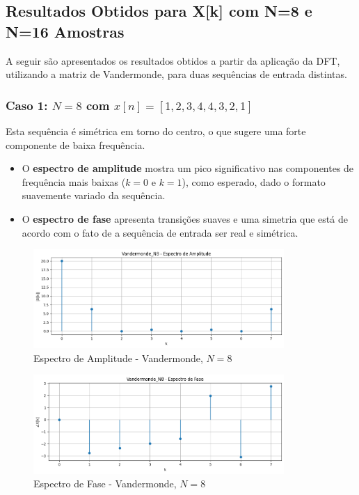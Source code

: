 \documentclass[12pt]{article}
\begin{document}
\newpage
\subsection{Resultados Obtidos para X[k] com N=8 e N=16 Amostras}

A seguir são apresentados os resultados obtidos a partir da aplicação da DFT, utilizando a matriz de Vandermonde, para duas sequências de entrada distintas.

\subsubsection{Caso 1: $N = 8$ com $x[n] = [1, 2, 3, 4, 4, 3, 2, 1]$}

Esta sequência é simétrica em torno do centro, o que sugere uma forte componente de baixa frequência.

\begin{itemize}
    \item O \textbf{espectro de amplitude} mostra um pico significativo nas componentes de frequência mais baixas ($k=0$ e $k=1$), como esperado, dado o formato suavemente variado da sequência.
    \item O \textbf{espectro de fase} apresenta transições suaves e uma simetria que está de acordo com o fato de a sequência de entrada ser real e simétrica.
\end{itemize}

\begin{figure}[H]
    \centering
    \includegraphics[width=0.85\textwidth]{imagens/Vandermonde_N8_amplitude.png}
    \caption{Espectro de Amplitude - Vandermonde, $N=8$}
\end{figure}

\begin{figure}[H]
    \centering
    \includegraphics[width=0.85\textwidth]{imagens/Vandermonde_N8_fase.png}
    \caption{Espectro de Fase - Vandermonde, $N=8$}
\end{figure}
\end{document}
